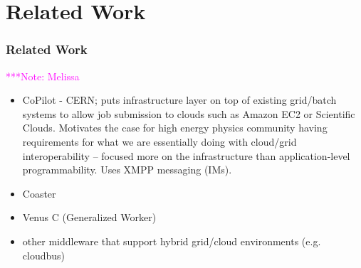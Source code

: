 \documentclass[times]{cpeauth}
\newcommand{\note}[1]{ {\textcolor{magenta} { ***Note: #1 }}}
\newcommand{\note}[1]{}
\begin{document}
\section{Related Work}


\subsubsection*{Related Work} 
\note{Melissa}

\begin{itemize}
       \item CoPilot - CERN; puts infrastructure layer on top of existing grid/batch systems to allow job submission to clouds such as Amazon EC2 or Scientific Clouds. Motivates the case for high energy physics community having requirements for what we are essentially doing with cloud/grid interoperability -- focused more on the infrastructure than application-level programmability. Uses XMPP messaging (IMs). 
	\item Coaster
	\item Venus C (Generalized Worker)
	\item other middleware that support hybrid grid/cloud environments (e.g. cloudbus)
\end{itemize}
\end{document}
